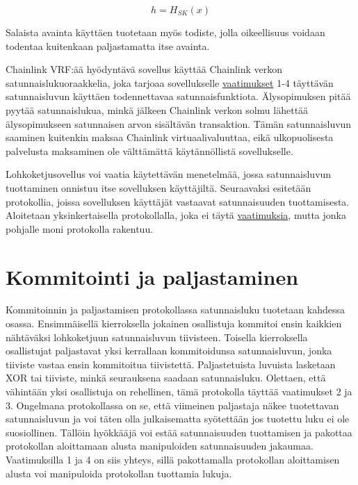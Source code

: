 \begin{equation}
    h = H_{SK}(x)
\end{equation}

Salaista avainta käyttäen tuotetaan myös todiste, jolla oikeellisuus voidaan todentaa kuitenkaan paljastamatta itse avainta.

Chainlink VRF:ää hyödyntävä sovellus käyttää Chainlink verkon satunnaislukuoraakkelia, joka tarjoaa sovellukselle \hyperref[vaatimukset]{vaatimukset} 1-4 täyttävän satunnaisluvun käyttäen todennettavaa satunnaisfunktiota. Älysopimuksen pitää pyytää satunnaislukua, minkä jälkeen Chainlink verkon solmu lähettää älysopimukseen satunnaisen arvon sisältävän transaktion. Tämän satunnaisluvun saaminen kuitenkin maksaa Chainlink virtuaalivaluuttaa, eikä ulkopuolisesta palvelusta maksaminen ole välttämättä käytännöllistä sovellukselle.

Lohkoketjusovellus voi vaatia käytettävän menetelmää, jossa satunnaisluvun tuottaminen onnistuu itse sovelluksen käyttäjiltä. Seuraavaksi esitetään protokollia, joissa sovelluksen käyttäjät vastaavat satunnaisuuden tuottamisesta. Aloitetaan yksinkertaisella protokollalla, joka ei täytä \hyperref[vaatimukset]{vaatimuksia}, mutta jonka pohjalle moni protokolla rakentuu.

\section{Kommitointi ja paljastaminen} %
Kommitoinnin ja paljastamisen protokollassa satunnaisluku tuotetaan kahdessa osassa. Ensimmäisellä kierroksella jokainen osallistuja kommitoi ensin kaikkien nähtäväksi lohkoketjuun satunnaisluvun tiivisteen. Toisella kierroksella osallistujat paljastavat yksi kerrallaan kommitoidunsa satunnaisluvun, jonka tiiviste vastaa ensin kommitoitua tiivistettä. Paljastetuista luvuista lasketaan XOR tai tiiviste, minkä seurauksena saadaan satunnaisluku. Olettaen, että vähintään yksi osallistuja on rehellinen, tämä protokolla täyttää vaatimukset 2 ja 3. Ongelmana protokollassa on se, että viimeinen paljastaja näkee tuotettavan satunnaisluvun ja voi täten olla julkaisematta syötettään jos tuotettu luku ei ole suosiollinen. Tällöin hyökkääjä voi estää satunnaisuuden tuottamisen ja pakottaa protokollan aloittamaan alusta manipuloiden satunnaisuuden jakaumaa. Vaatimuksilla 1 ja 4 on siis yhteys, sillä pakottamalla protokollan aloittamisen alusta voi manipuloida protokollan tuottamia lukuja.


